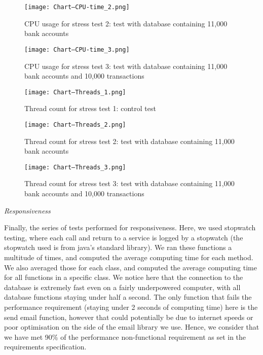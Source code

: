 \documentclass[12pt]{article}
\newcounter{req ID}
\begin{document}
\begin{figure}[htbp]
    \texttt{[image: Chart--CPU-time\_2.png]}
    \caption{CPU usage for stress test 2: test with database containing 11,000 bank accounts}
    \label{fig:CPU2}
\end{figure}

\begin{figure}[htbp]
    \texttt{[image: Chart--CPU-time\_3.png]}
    \caption{CPU usage for stress test 3: test with database containing 11,000 bank accounts and 10,000 transactions}
    \label{fig:CPU3}
\end{figure}


\begin{figure}[htbp]
    \texttt{[image: Chart--Threads\_1.png]}
    \caption{Thread count for stress test 1: control test}
    \label{fig:Thread1}
\end{figure}

\begin{figure}[htbp]
    \texttt{[image: Chart--Threads\_2.png]}
    \caption{Thread count for stress test 2: test with database containing 11,000 bank accounts}
    \label{fig:Thread2}
\end{figure}

\begin{figure}[htbp]
    \texttt{[image: Chart--Threads\_3.png]}
    \caption{Thread count for stress test 3: test with database containing 11,000 bank accounts and 10,000 transactions}
    \label{fig:Thread3}
\end{figure}

\clearpage



\textit{Responsiveness}

Finally, the series of tests performed for responsiveness. Here, we used stopwatch testing, where each call and return to a service is logged by a stopwatch (the stopwatch used is from java's standard library). We ran these functions a multitude of times, and computed the average computing time for each method. We also averaged those for each class, and computed the average computing time for all functions in a specific class. We notice here that the connection to the database is extremely fast even on a fairly underpowered computer, with all database functions staying under half a second. The only function that fails the performance requirement (staying under 2 seconds of computing time) here is the send email function, however that could potentially be due to internet speeds or poor optimisation on the side of the email library we use. Hence, we consider that we have met 90\% of the performance non-functional requirement as set in the requirements specification.
\end{document}
